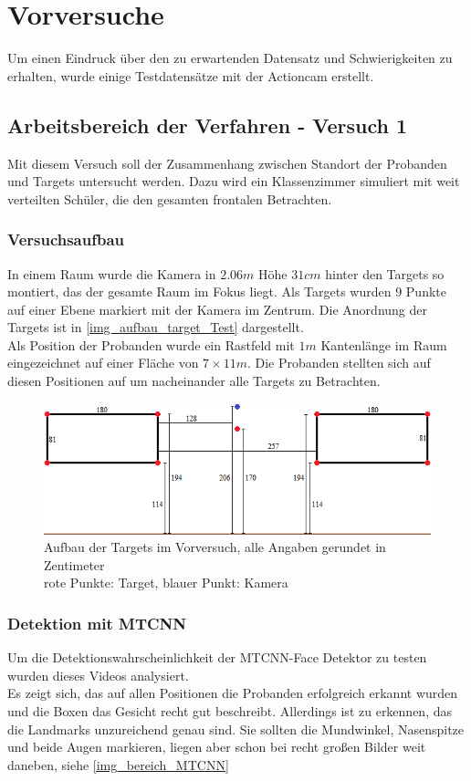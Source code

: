 \section{Vorversuche}
\label{Vorversuche}
Um einen Eindruck über den zu erwartenden Datensatz und Schwierigkeiten zu erhalten, wurde einige Testdatensätze mit der Actioncam erstellt.\\
\subsection{Arbeitsbereich der Verfahren - Versuch 1}
Mit diesem Versuch soll der Zusammenhang zwischen Standort der Probanden und Targets untersucht werden. Dazu wird ein Klassenzimmer simuliert mit weit verteilten Schüler, die den gesamten frontalen Betrachten.
\subsubsection{Versuchsaufbau}
In einem Raum wurde die Kamera in $2.06m$ Höhe $31cm$ hinter den Targets so montiert, das der gesamte Raum im Fokus liegt. Als Targets wurden 9 Punkte auf einer Ebene markiert mit der Kamera im Zentrum. Die Anordnung der Targets ist in \autoref{img_aufbau_target_Test} dargestellt.\\
Als Position der Probanden wurde ein Rastfeld mit $1m$ Kantenlänge im Raum eingezeichnet auf einer Fläche von $7 \times 11m$. Die Probanden stellten sich auf diesen Positionen auf um nacheinander alle Targets zu Betrachten. 
\begin{figure}
	\centering
	\includegraphics[width=0.7\linewidth]{PositionWinkel/Target}
	\caption{Aufbau der Targets im Vorversuch, alle Angaben gerundet in Zentimeter\\rote Punkte: Target, blauer Punkt: Kamera}
	\label{img_aufbau_target_Test}
\end{figure}
\subsubsection{Detektion mit MTCNN}
Um die Detektionswahrscheinlichkeit der MTCNN-Face Detektor zu testen wurden dieses Videos analysiert.\\
Es zeigt sich, das auf allen Positionen die Probanden erfolgreich erkannt wurden und die Boxen das Gesicht recht gut beschreibt. Allerdings ist zu erkennen, das die Landmarks unzureichend genau sind. Sie sollten die Mundwinkel, Nasenspitze und beide Augen markieren, liegen aber schon bei recht großen Bilder weit daneben, siehe \autoref{img_bereich_MTCNN}
